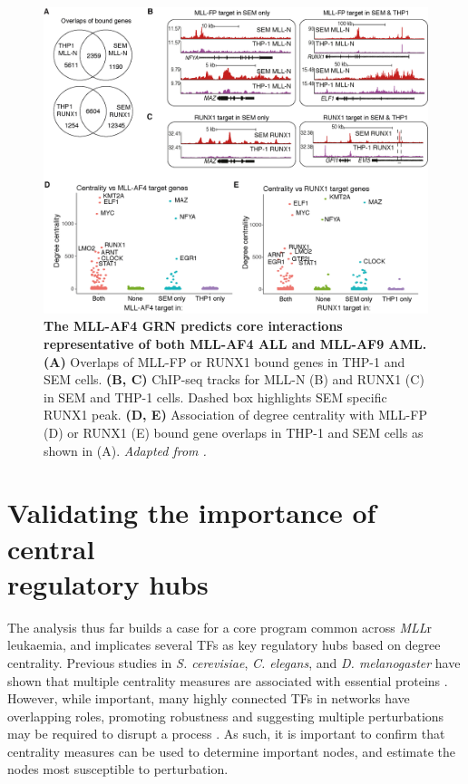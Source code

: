 \begin{figure}[htbp]
    \centering
    \includegraphics[width=\textwidth,height=\textheight,keepaspectratio]{figures/chapter4/ch4_sem-thp1.png}
    \caption[{The MLL-AF4 GRN predicts core interactions representative of both MLL-AF4 ALL and MLL-AF9 AML.}]
    {\textbf{The MLL-AF4 GRN predicts core interactions representative of both MLL-AF4 ALL and MLL-AF9 AML.} 
    \textbf{(A)} Overlaps of MLL-FP or RUNX1 bound genes in THP-1 and SEM cells. 
    \textbf{(B, C)} ChIP-seq tracks for MLL-N (B) and RUNX1 (C) in SEM and THP-1 cells. Dashed box highlights SEM specific RUNX1 peak.
    \textbf{(D, E)} Association of degree centrality with MLL-FP (D) or RUNX1 (E) bound gene overlaps in THP-1 and SEM cells as shown in (A). 
    \textit{Adapted from \cite{harman_kmt2a-aff1_2021}.}
    }
    \label{fig:ch4_sem-thp1}
\end{figure}

\section[Validating the importance of central regulatory hubs]{\label{ch4:key-hubs}Validating the importance of central\\regulatory hubs}

The analysis thus far builds a case for a core program common across \textit{MLL}r leukaemia, and implicates several TFs as key regulatory hubs based on degree centrality. Previous studies in \textit{S. cerevisiae}, \textit{C. elegans}, and \textit{D. melanogaster} have shown that multiple centrality measures are associated with essential proteins \citep{hahn_comparative_2005, jeong_lethality_2001, koschutzki_centrality_2008}. However, while important, many highly connected TFs in networks have overlapping roles, promoting robustness and suggesting multiple perturbations may be required to disrupt a process \citep{lehner_systematic_2006, byrne_global_2007, macneil_gene_2011}. As such, it is important to confirm that centrality measures can be used to determine important nodes, and estimate the nodes most susceptible to perturbation.

